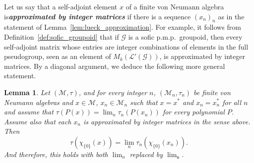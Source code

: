 \documentclass[10pt]{amsart}
\newtheorem{lemm}[cdrthm]{Lemma}
\theoremstyle{definition}
\newcommand{\defin}[1]{\textbf{\emph{#1}}}
\newcommand{\cM}{\mathcal{M}}
\newcommand{\LL}{\mathcal{L}}
\newcommand{\cg}{\mathcal{G}}
\newcommand{\ul}{\mathfrak{u}}
\newcommand{\pmp}{p.m.p.\ }
\begin{document}
Let us say that a self-adjoint element $x$ of a finite von Neumann algebra is\linebreak\defin{approximated by integer matrices} if there is a sequence $(x_n)_n$ as in the statement of Lemma~\ref{lem:lueck_approximation}. For example, it follows from Definition~\ref{def:sofic_groupoid} that if $\cg$ is a sofic \pmp groupoid, then every self-adjoint matrix whose entries are integer combinations of elements in the full pseudogroup, seen as an element of $M_k(\LL'(\cg))$, is approximated by integer matrices. By a diagonal argument, we deduce the following more general statement.

\begin{lemm}\label{lem:lueck_approximation_sofic}
Let $(\cM,\tau)$, and for every integer $n$, $(\cM_n,\tau_n)$ be finite von Neumann algebras and $x \in \cM$, $x_n \in \cM_n$ such that $x=x^*$ and $x_n=x_n^*$ for all $n$ and assume that $\tau(P(x)) = \lim_n \tau_n(P(x_n))$ for every polynomial $P$. Assume also that each $x_n$ is approximated by integer matrices in the sense above. Then
\[
\tau\left(\chi_{\{0\}}(x)\right) = \lim_n\tau_n\left(\chi_{\{0\}}(x_n)\right).
\]
And therefore, this holds with both $\lim_n$ replaced by $\lim_\ul$.
\end{lemm}
\end{document}
